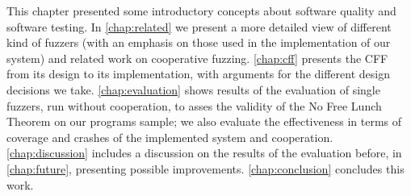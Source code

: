 This chapter presented some introductory concepts about software quality and
software testing. In \autoref{chap:related} we present a more detailed view of
different kind of fuzzers (with an emphasis on those used in the implementation
of our system) and related work on cooperative fuzzing. \autoref{chap:cff}
presents the \ac{CFF} from its design to its implementation, with arguments for
the different design decisions we take. \autoref{chap:evaluation} shows results
of the evaluation of single fuzzers, run without cooperation, to asses the
validity of the No Free Lunch Theorem on our programs sample; we also evaluate
the effectiveness in terms of coverage and crashes of the implemented system and
cooperation. \autoref{chap:discussion} includes a discussion on the results of
the evaluation before, in \autoref{chap:future}, presenting possible
improvements. \autoref{chap:conclusion} concludes this work.




